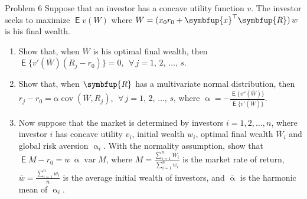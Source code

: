 \documentclass[10pt,handout]{beamer}
\newcommand{\ds}{\displaystyle}
\newcommand{\vx}{\symbfup{x}}
\newcommand{\vR}{\symbfup{R}}
\DeclareMathOperator\expc{\mathsf{E}}
\DeclareMathOperator\var{var}
\DeclareMathOperator\cov{cov}
\theoremstyle{definition}
\begin{document}
\begin{frame}[allowframebreaks]
\begin{enumerate}
  \end{enumerate}
\end{frame}

\begin{frame}{Problem 6}
  Suppose that an investor has a concave utility function $v$. The investor seeks to maximize $\expc v(W)$ where $\ds W = (x_0 r_0 + \vx^\top\vR)\,w$ is his final wealth.
  \begin{enumerate}
    \item Show that, when $\overline{W}$ is his optimal final wealth, then $\ds\expc\big\{v'(\overline{W})(R_j - r_0)\big\} = 0$, $\;\forall\,j = 1,\,2,\,\ldots,\,s$.
    \item Show that, when $\vR$ has a multivariate normal distribution, then $\ds r_j - r_0 = \alpha\cov(\overline{W}, R_j)$, $\;\forall\,j = 1,\,2,\,\ldots,\,s$, where $\ds\upalpha = -\frac{\expc\big\{v''(\overline{W})\big\}}{\expc\big\{v'(\overline{W})\big\}}$. %
    \item Now suppose that the market is determined by investors $i = 1, 2, \ldots, n$, where investor $i$ has concave utility $v_i$, initial wealth $w_i$, optimal final wealth $\overline{W}_i$ and global risk aversion $\upalpha_i$. With the normality assumption, show that $\ds\expc M - r_0 = \overline{w}\,\overline{\upalpha}\var M$, where $\ds M = \frac{\sum_{i=1}^n\overline{W}_i}{\sum_{i=1}^n w_i}$ is the market rate of return, $\ds\overline{w} = \frac{\sum_{i=1}^n w_i}{n}$ is the average initial wealth of investors, and $\overline{\upalpha}$ is the harmonic mean of $\upalpha_i$.
  \end{enumerate}
\end{frame}
\end{document}
